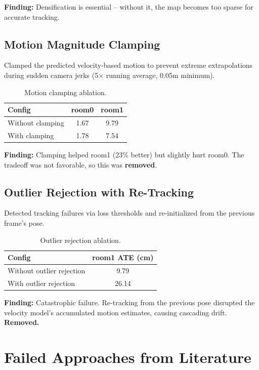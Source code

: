 \documentclass[10pt,twocolumn]{article}
\begin{document}
\textbf{Finding:} Densification is essential -- without it, the map becomes too sparse for accurate tracking.

\subsection{Motion Magnitude Clamping}

Clamped the predicted velocity-based motion to prevent extreme extrapolations during sudden camera jerks (5$\times$ running average, 0.05m minimum).

\begin{table}[h]
\centering
\caption{Motion clamping ablation.}
\label{tab:clamp}
\begin{tabular}{lcc}
\toprule
\textbf{Config} & \textbf{room0} & \textbf{room1} \\
\midrule
Without clamping & 1.67 & 9.79 \\
With clamping & 1.78 & 7.54 \\
\bottomrule
\end{tabular}
\end{table}

\textbf{Finding:} Clamping helped room1 (23\% better) but slightly hurt room0. The tradeoff was not favorable, so this was \textbf{removed}.

\subsection{Outlier Rejection with Re-Tracking}

Detected tracking failures via loss thresholds and re-initialized from the previous frame's pose.

\begin{table}[h]
\centering
\caption{Outlier rejection ablation.}
\label{tab:outlier}
\begin{tabular}{lc}
\toprule
\textbf{Config} & \textbf{room1 ATE (cm)} \\
\midrule
Without outlier rejection & 9.79 \\
With outlier rejection & 26.14 \\
\bottomrule
\end{tabular}
\end{table}

\textbf{Finding:} \textcolor{regressed}{Catastrophic failure.} Re-tracking from the previous pose disrupted the velocity model's accumulated motion estimates, causing cascading drift. \textbf{Removed.}

\section{Failed Approaches from Literature}
\end{document}
